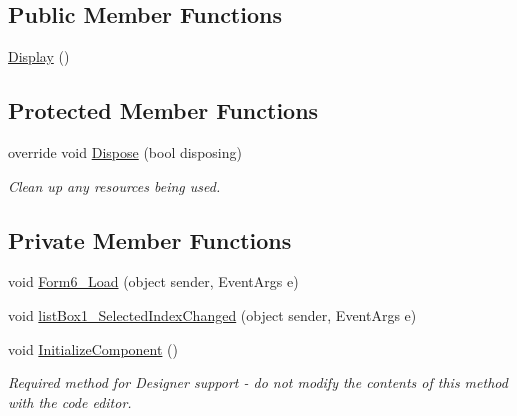 \subsection*{Public Member Functions}
\begin{DoxyCompactItemize}
\item 
\hyperlink{classProject__Codename__Olympia__v1_1_1__0_1_1Display_a5b82498205350df8a82355b725186908}{Display} ()
\end{DoxyCompactItemize}
\subsection*{Protected Member Functions}
\begin{DoxyCompactItemize}
\item 
override void \hyperlink{classProject__Codename__Olympia__v1_1_1__0_1_1Display_aba97182a4a2a398e10792c631de3556f}{Dispose} (bool disposing)
\begin{DoxyCompactList}\small\item\em Clean up any resources being used. \end{DoxyCompactList}\end{DoxyCompactItemize}
\subsection*{Private Member Functions}
\begin{DoxyCompactItemize}
\item 
void \hyperlink{classProject__Codename__Olympia__v1_1_1__0_1_1Display_a98a06c8d9c11129fe3e9e2be77939eff}{Form6\+\_\+\+Load} (object sender, Event\+Args e)
\item 
void \hyperlink{classProject__Codename__Olympia__v1_1_1__0_1_1Display_a2d9125d0bf48968e05e18302828c08ea}{list\+Box1\+\_\+\+Selected\+Index\+Changed} (object sender, Event\+Args e)
\item 
void \hyperlink{classProject__Codename__Olympia__v1_1_1__0_1_1Display_a8f3afdb4d89c000c7d6fe426b8232391}{Initialize\+Component} ()
\begin{DoxyCompactList}\small\item\em Required method for Designer support -\/ do not modify the contents of this method with the code editor. \end{DoxyCompactList}\end{DoxyCompactItemize}
